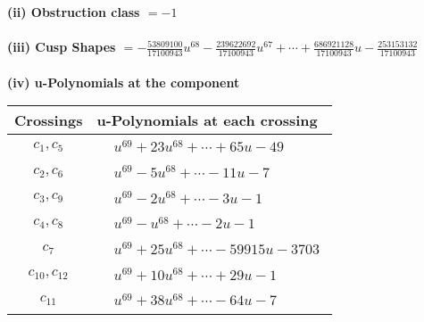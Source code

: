 \documentclass[1p]{elsarticle_modified}
\theoremstyle{definition}
\begin{document}
\flushleft \textbf{(ii) Obstruction class $= -1$}\\~\\
\flushleft \textbf{(iii) Cusp Shapes $= -\frac{53809100}{17100943} u^{68}-\frac{239622692}{17100943} u^{67}+\cdots+\frac{686921128}{17100943} u-\frac{253153132}{17100943}$}\\~\\
\newpage\renewcommand{\arraystretch}{1}
\flushleft \textbf{(iv) u-Polynomials at the component}\newline \\
\begin{tabular}{m{50pt}|m{274pt}}
Crossings & \hspace{64pt}u-Polynomials at each crossing \\
\hline $$\begin{aligned}c_{1},c_{5}\end{aligned}$$&$\begin{aligned}
&u^{69}+23 u^{68}+\cdots+65 u-49
\end{aligned}$\\
\hline $$\begin{aligned}c_{2},c_{6}\end{aligned}$$&$\begin{aligned}
&u^{69}-5 u^{68}+\cdots-11 u-7
\end{aligned}$\\
\hline $$\begin{aligned}c_{3},c_{9}\end{aligned}$$&$\begin{aligned}
&u^{69}-2 u^{68}+\cdots-3 u-1
\end{aligned}$\\
\hline $$\begin{aligned}c_{4},c_{8}\end{aligned}$$&$\begin{aligned}
&u^{69}- u^{68}+\cdots-2 u-1
\end{aligned}$\\
\hline $$\begin{aligned}c_{7}\end{aligned}$$&$\begin{aligned}
&u^{69}+25 u^{68}+\cdots-59915 u-3703
\end{aligned}$\\
\hline $$\begin{aligned}c_{10},c_{12}\end{aligned}$$&$\begin{aligned}
&u^{69}+10 u^{68}+\cdots+29 u-1
\end{aligned}$\\
\hline $$\begin{aligned}c_{11}\end{aligned}$$&$\begin{aligned}
&u^{69}+38 u^{68}+\cdots-64 u-7
\end{aligned}$\\
\hline
\end{tabular}\\~\\
\end{document}
